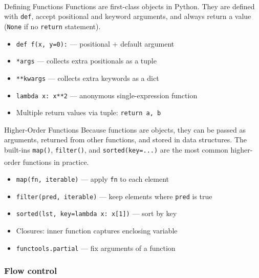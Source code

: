 \begin{v3topic}{Defining Functions}
    Functions are first-class objects in Python\textsuperscript{\cite{romanoLearnPythonProgramming2021}}.
    They are defined with \texttt{def}, accept positional and keyword arguments, and always return a value (\texttt{None} if no \texttt{return} statement).
\visualseparator
    \begin{itemize}
        \item \texttt{def f(x, y=0):} --- positional + default argument
        \item \texttt{*args} --- collects extra positionals as a tuple
        \item \texttt{**kwargs} --- collects extra keywords as a dict
        \item \texttt{lambda x: x**2} --- anonymous single-expression function
        \item Multiple return values via tuple: \texttt{return a, b}
    \end{itemize}

\end{v3topic}
\begin{v3topic}{Higher-Order Functions}
    Because functions are objects, they can be passed as arguments, returned from other functions, and stored in data structures.
    The built-ins \texttt{map()}, \texttt{filter()}, and \texttt{sorted(key=...)} are the most common higher-order functions in practice\textsuperscript{\cite{romanoLearnPythonProgramming2021}}.
\visualseparator
    \begin{itemize}
        \item \texttt{map(fn, iterable)} --- apply \texttt{fn} to each element
        \item \texttt{filter(pred, iterable)} --- keep elements where \texttt{pred} is true
        \item \texttt{sorted(lst, key=lambda x: x[1])} --- sort by key
        \item Closures: inner function captures enclosing variable
        \item \texttt{functools.partial} --- fix arguments of a function
    \end{itemize}
\end{v3topic}

\subsubsection{Flow control}

